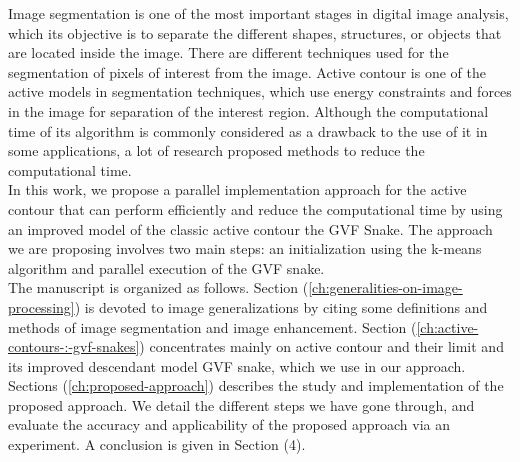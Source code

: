 \documentclass[english,a4,12pt]{report}
\begin{document}
    Image segmentation is one of the most important stages in digital image analysis,
    which its objective is to separate the different shapes, structures, or objects that are
    located inside the image. There are different techniques used for the segmentation of pixels
    of interest from the image. Active contour is one of the active models in segmentation techniques,
    which use energy constraints and forces in the image for separation of the interest region.
    Although the computational time of its algorithm is commonly considered as a drawback to the use
    of it in some applications, a lot of research proposed methods to reduce the computational time.\\
    In this work, we propose a parallel implementation approach for the active contour that can perform
    efficiently and reduce the computational time by using an improved model of the classic active contour
    the GVF Snake. The approach we are proposing involves two main steps:  an initialization using the
    k-means algorithm and parallel execution of the GVF snake.\\
    The manuscript is organized as follows. Section (\ref{ch:generalities-on-image-processing}) is devoted to
    image generalizations by citing some definitions and methods of image segmentation and image enhancement.
    Section (\ref{ch:active-contours-:-gvf-snakes}) concentrates mainly on active contour and their
    limit and its improved descendant model GVF snake, which we use in our approach. Sections (\ref{ch:proposed-approach}) describes
    the study and implementation of  the proposed approach. We detail the different steps we have gone through,
    and evaluate the accuracy and applicability of the proposed approach via an experiment. A conclusion is given
    in Section (4).

    

    

    

    
\end{document}
